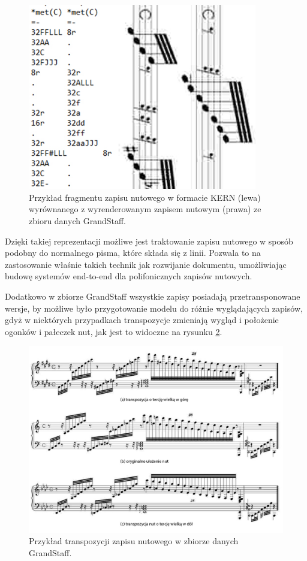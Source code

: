 \begin{figure}[htb]
	\centering
	\includegraphics[width=10cm]{images/kern-nuty.jpg}
	\caption{Przykład fragmentu zapisu nutowego w formacie KERN (lewa) wyrównanego z wyrenderowanym zapisem nutowym (prawa) ze zbioru danych GrandStaff.}
	\label{fig:kern-score}
\end{figure}

Dzięki takiej reprezentacji możliwe jest traktowanie zapisu nutowego w sposób podobny do normalnego pisma, które składa się z linii. Pozwala to na zastosowanie właśnie takich technik jak rozwijanie dokumentu\cite{Coquenet2021}, umożliwiając budowę systemów end-to-end dla polifonicznych zapisów nutowych.

Dodatkowo w zbiorze GrandStaff wszystkie zapisy posiadają przetransponowane wersje, by możliwe było przygotowanie modelu do różnie wyglądających zapisów, gdyż w niektórych przypadkach transpozycje zmieniają wygląd i położenie ogonków i pałeczek nut, jak jest to widoczne na rysunku \ref{fig:score-transposition}.

\begin{figure}[htb]
	\centering
	\includegraphics[width=14cm]{images/grandstaff-transpozycje.jpg}
	\caption{Przykład transpozycji zapisu nutowego w zbiorze danych GrandStaff.}
	\label{fig:score-transposition}
\end{figure}

